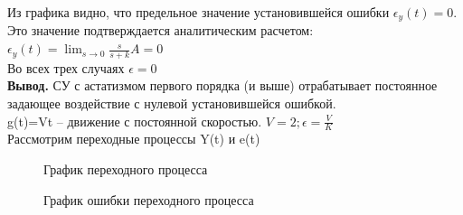 \documentclass[a4paper, 11pt]{article}
\begin{document}
\newpage

Из графика видно, что предельное значение установившейся ошибки $\epsilon_y(t)=0$. Это значение подтверждается аналитическим расчетом: $\epsilon_y(t)=\lim_{s\to0}\frac{s}{s+k}A=0$\\


Во всех трех случаях $\epsilon = 0$\\

\textbf{Вывод.} СУ с астатизмом первого порядка (и выше) отрабатывает постоянное задающее воздействие с нулевой установившейся ошибкой.\\


g(t)=Vt – движение с постоянной скоростью.  $V = 2; \epsilon=\frac{V}{K}$\\

Рассмотрим переходные процессы Y(t) и e(t)

\begin{figure}[h!]
    \caption{График переходного процесса}
    \label{two}
\end{figure}

\begin{figure}[h!]
    \caption{График ошибки переходного процесса}
    \label{tree}
\end{figure}

\newpage
\end{document}
